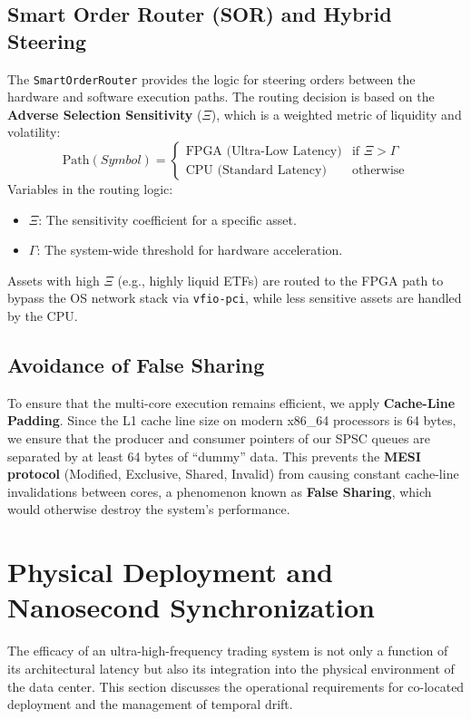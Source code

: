 \subsection{Smart Order Router (SOR) and Hybrid Steering}
The \texttt{SmartOrderRouter} provides the logic for steering orders between the hardware and software execution paths. The routing decision is based on the \textbf{Adverse Selection Sensitivity} ($\Xi$), which is a weighted metric of liquidity and volatility:
\begin{equation}
    \text{Path}(Symbol) = \begin{cases} \text{FPGA (Ultra-Low Latency)} & \text{if } \Xi > \Gamma \\ \text{CPU (Standard Latency)} & \text{otherwise} \end{cases}
\end{equation}
Variables in the routing logic:
\begin{itemize}
    \item $\Xi$: The sensitivity coefficient for a specific asset.
    \item $\Gamma$: The system-wide threshold for hardware acceleration.
\end{itemize}
Assets with high $\Xi$ (e.g., highly liquid ETFs) are routed to the FPGA path to bypass the OS network stack via \texttt{vfio-pci}, while less sensitive assets are handled by the CPU.

\subsection{Avoidance of False Sharing}
To ensure that the multi-core execution remains efficient, we apply \textbf{Cache-Line Padding}. Since the L1 cache line size on modern x86\_64 processors is 64 bytes, we ensure that the producer and consumer pointers of our SPSC queues are separated by at least 64 bytes of ``dummy'' data. This prevents the \textbf{MESI protocol} (Modified, Exclusive, Shared, Invalid) from causing constant cache-line invalidations between cores, a phenomenon known as \textbf{False Sharing}, which would otherwise destroy the system's performance.

\section{Physical Deployment and Nanosecond Synchronization}
The efficacy of an ultra-high-frequency trading system is not only a function of its architectural latency but also its integration into the physical environment of the data center. This section discusses the operational requirements for co-located deployment and the management of temporal drift.

